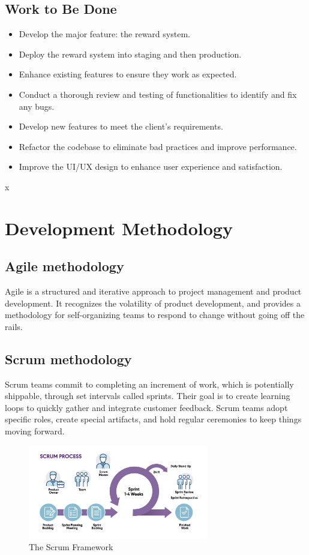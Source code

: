 \subsection{Work to Be Done}
\begin{itemize}
    \item Develop the major feature: the reward system.
    \item  Deploy the reward system into staging and then production.
    \item Enhance existing features to ensure they work as expected.
    \item Conduct a thorough review and testing of functionalities to identify and fix any bugs.
    \item Develop new features to meet the client's requirements.
    \item Refactor the codebase to eliminate bad practices and improve performance.
    \item Improve the UI/UX design to enhance user experience and satisfaction.
\end{itemize}
x
\section{Development Methodology}
\subsection{Agile methodology}
Agile is a structured and iterative approach to project management and product development.
It recognizes the volatility of product development, and provides a methodology for self-organizing teams to respond to change without going off the rails.

\subsection{Scrum methodology}
Scrum teams commit to completing an increment of work, which is potentially shippable, through set intervals called sprints.
Their goal is to create learning loops to quickly gather and integrate customer feedback.
Scrum teams adopt specific roles, create special artifacts, and hold regular ceremonies to keep things moving forward.


\begin{figure}[H]
    \centering
    \includegraphics[width=0.7\textwidth]{src/assets/chapters/blog-scrum-process-opt.jpg}
    \caption{The Scrum Framework}
    \label{fig:Scrum_Framework_image}
\end{figure}


